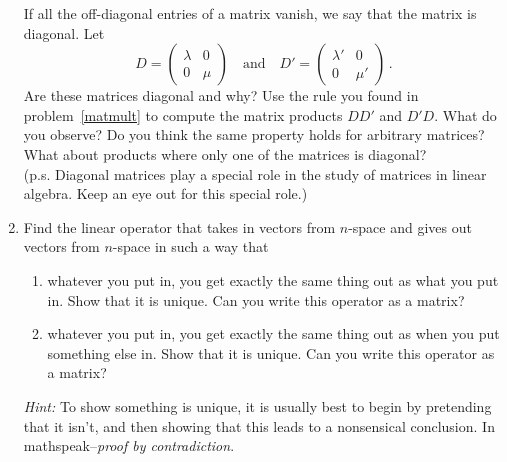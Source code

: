 \begin{enumerate}
If all the off-diagonal entries of a matrix vanish, we say that the matrix is diagonal. Let
\[
D=\begin{pmatrix}\lambda&0\\0&\mu\end{pmatrix}\quad \mbox{and}\quad D'=\begin{pmatrix}\lambda'&0\\0&\mu'\end{pmatrix}\, .
\]
Are these matrices diagonal and why? Use the rule you found in problem~\ref{matmult} to compute
the matrix products $DD'$ and $D'D$. What do you observe? Do you think the same property holds for arbitrary matrices? What about products
where only one of the matrices is diagonal?\\

(p.s. Diagonal matrices play a special role in the study of matrices in linear algebra. Keep an eye out for this special role.)

\item \label{idprob} Find the linear operator that takes in vectors from $n$-space and gives out vectors from $n$-space in such a way that 
\begin{enumerate}
\item whatever you put in, you get exactly the same thing out as what you put in. Show that it is unique. Can you write this operator as a matrix? 
\item whatever you put in, you get exactly the same thing out as when you put something else in. Show that it is unique. Can you write this operator as a matrix? 
\end{enumerate}
{\itshape Hint:} To show something is unique, it is usually best to begin by pretending that it isn't, and then showing that this leads to a nonsensical conclusion. In mathspeak--{\itshape proof by contradiction}.



\end{enumerate}
